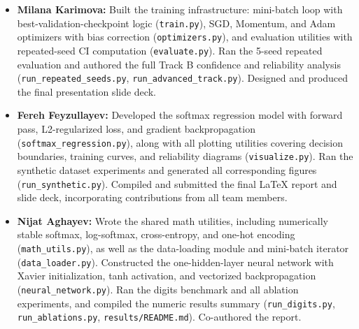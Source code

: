 \documentclass[sigconf,screen,nonacm]{acmart}
\begin{document}
\begin{itemize}[leftmargin=*]
    \item \textbf{Milana Karimova:} Built the training infrastructure: mini-batch loop with best-validation-checkpoint logic (\texttt{train.py}), SGD, Momentum, and Adam optimizers with bias correction (\texttt{optimizers.py}), and evaluation utilities with repeated-seed CI computation (\texttt{evaluate.py}). Ran the 5-seed repeated evaluation and authored the full Track B confidence and reliability analysis (\texttt{run\_repeated\_seeds.py}, \texttt{run\_advanced\_track.py}). Designed and produced the final presentation slide deck.

    \item \textbf{Fereh Feyzullayev:} Developed the softmax regression model with forward pass, L2-regularized loss, and gradient backpropagation (\texttt{softmax\_regression.py}), along with all plotting utilities covering decision boundaries, training curves, and reliability diagrams (\texttt{visualize.py}). Ran the synthetic dataset experiments and generated all corresponding figures (\texttt{run\_synthetic.py}). Compiled and submitted the final LaTeX report and slide deck, incorporating contributions from all team members.

    \item \textbf{Nijat Aghayev:} Wrote the shared math utilities, including numerically stable softmax, log-softmax, cross-entropy, and one-hot encoding (\texttt{math\_utils.py}), as well as the data-loading module and mini-batch iterator (\texttt{data\_loader.py}). Constructed the one-hidden-layer neural network with Xavier initialization, tanh activation, and vectorized backpropagation (\texttt{neural\_network.py}). Ran the digits benchmark and all ablation experiments, and compiled the numeric results summary (\texttt{run\_digits.py}, \texttt{run\_ablations.py}, \texttt{results/README.md}). Co-authored the report.
\end{itemize}
\end{document}
